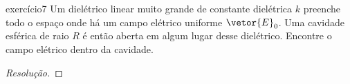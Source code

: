 \begin{exercício}{}{exercício7}
    Um dielétrico linear muito grande de constante dielétrica \(k\) preenche todo o espaço onde há um campo elétrico uniforme \(\vetor{E}_0\). Uma cavidade esférica de raio \(R\) é então aberta em algum lugar desse dielétrico. Encontre o campo elétrico dentro da cavidade.
\end{exercício}
\begin{proof}[Resolução]

\end{proof}
